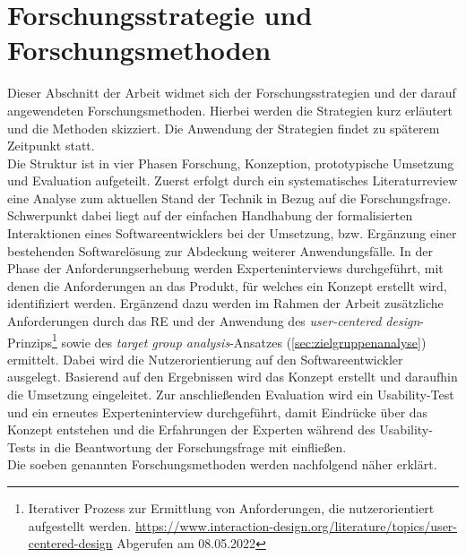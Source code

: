 \section{Forschungsstrategie und Forschungsmethoden}
\label{sec:forschungsstrategie}
    Dieser Abschnitt der Arbeit widmet sich der Forschungsstrategien und der darauf angewendeten Forschungsmethoden. 
    Hierbei werden die Strategien kurz erläutert und die Methoden skizziert. Die Anwendung der Strategien findet zu 
    späterem Zeitpunkt statt. 
    \\
    Die Struktur ist in vier Phasen Forschung, Konzeption, prototypische Umsetzung und Evaluation aufgeteilt. Zuerst erfolgt durch ein 
    systematisches Literaturreview eine Analyse zum aktuellen Stand der Technik in Bezug auf die Forschungsfrage. 
    Schwerpunkt dabei liegt auf der einfachen Handhabung der formalisierten 
    Interaktionen eines Softwareentwicklers bei der Umsetzung, bzw. Ergänzung einer bestehenden 
    Softwarelösung zur Abdeckung weiterer Anwendungsfälle. 
    In der Phase der Anforderungserhebung werden Experteninterviews durchgeführt, mit denen die Anforderungen an das Produkt, 
    für welches ein Konzept erstellt wird, identifiziert werden. Ergänzend dazu werden im Rahmen der Arbeit zusätzliche 
    Anforderungen durch das \ac{RE} und der Anwendung des \textit{user-centered design}-Prinzips\footnote{Iterativer Prozess zur Ermittlung von Anforderungen, die nutzerorientiert aufgestellt werden. \url{https://www.interaction-design.org/literature/topics/user-centered-design} Abgerufen am 08.05.2022} 
    sowie des \textit{target group analysis}-Ansatzes (\ref{sec:zielgruppenanalyse}) ermittelt. Dabei wird die 
    Nutzerorientierung auf den Softwareentwickler ausgelegt. Basierend auf den Ergebnissen wird das Konzept erstellt und daraufhin die Umsetzung eingeleitet. 
    Zur anschließenden Evaluation wird ein Usability-Test und ein erneutes Experteninterview durchgeführt, damit 
    Eindrücke über das Konzept entstehen und die Erfahrungen der Experten während des Usability-Tests 
    in die Beantwortung der Forschungsfrage mit einfließen.
    \\
    Die soeben genannten Forschungsmethoden werden nachfolgend näher erklärt.

